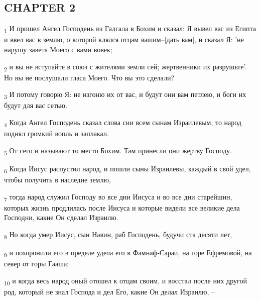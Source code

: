 \subsection{CHAPTER 2}
\begin{tcolorbox}
\textsubscript{1} И пришел Ангел Господень из Галгала в Бохим и сказал: Я вывел вас из Египта и ввел вас в землю, о которой клялся отцам вашим--[дать вам], и сказал Я: 'не нарушу завета Моего с вами вовек;
\end{tcolorbox}
\begin{tcolorbox}
\textsubscript{2} и вы не вступайте в союз с жителями земли сей; жертвенники их разрушьте'. Но вы не послушали гласа Моего. Что вы это сделали?
\end{tcolorbox}
\begin{tcolorbox}
\textsubscript{3} И потому говорю Я: не изгоню их от вас, и будут они вам петлею, и боги их будут для вас сетью.
\end{tcolorbox}
\begin{tcolorbox}
\textsubscript{4} Когда Ангел Господень сказал слова сии всем сынам Израилевым, то народ поднял громкий вопль и заплакал.
\end{tcolorbox}
\begin{tcolorbox}
\textsubscript{5} От сего и называют то место Бохим. Там принесли они жертву Господу.
\end{tcolorbox}
\begin{tcolorbox}
\textsubscript{6} Когда Иисус распустил народ, и пошли сыны Израилевы, каждый в свой удел, чтобы получить в наследие землю,
\end{tcolorbox}
\begin{tcolorbox}
\textsubscript{7} тогда народ служил Господу во все дни Иисуса и во все дни старейшин, которых жизнь продлилась после Иисуса и которые видели все великие дела Господни, какие Он сделал Израилю.
\end{tcolorbox}
\begin{tcolorbox}
\textsubscript{8} Но когда умер Иисус, сын Навин, раб Господень, будучи ста десяти лет,
\end{tcolorbox}
\begin{tcolorbox}
\textsubscript{9} и похоронили его в пределе удела его в Фамнаф-Сараи, на горе Ефремовой, на север от горы Гааша;
\end{tcolorbox}
\begin{tcolorbox}
\textsubscript{10} и когда весь народ оный отошел к отцам своим, и восстал после них другой род, который не знал Господа и дел Его, какие Он делал Израилю, --
\end{tcolorbox}
